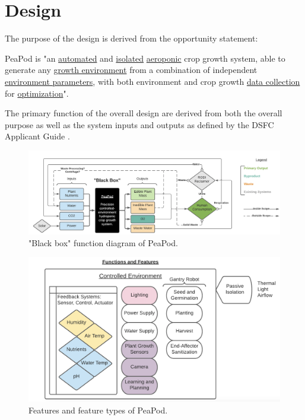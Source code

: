 \documentclass{report}
\begin{document}
\newpage

\section{Design}

The purpose of the design is derived from the opportunity statement:

PeaPod is "an \uline{automated} and \uline{isolated} \uline{aeroponic} crop growth system, able to generate any \uline{growth environment} from a combination of independent \uline{environment parameters}, with both environment and crop growth \uline{data collection} for \uline{optimization}".

The primary function of the overall design are derived from both the overall purpose as well as the system inputs and outputs as defined by the DSFC Applicant Guide \cite{applicantguide}.

\begin{figure}[h]
    \centering
    \includegraphics[width=15cm]{images/blackbox.png}
    \hfill
    \caption{"Black box" function diagram of PeaPod.}
\end{figure}

\begin{figure}[h]
    \centering
    \includegraphics[width=12cm]{images/features.png}
    \hfill
    \caption{Features and feature types of PeaPod.}
\end{figure}
\end{document}
